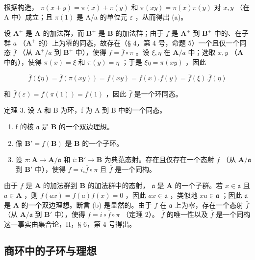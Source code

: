 根据构造， \(\pi(x + y) = \pi(x) + \pi(y)\) 和 \(\pi(xy) = \pi(x)\pi(y)\) 对 \(x, y\) （在 A 中）成立；且 \(\pi(1)\) 是 A/a 的单位元 \(\varepsilon\) ，从而得出 (a)。

设 \(\mathbf{A}^{+}\) 是 \(\mathbf{A}\) 的加法群，而 \(\mathbf{B}^{+}\) 是 \(\mathbf{B}\) 的加法群；由于 \(f\) 是 \(\mathbf{A}^{+}\) 到 \(\mathbf{B}^{+}\) 中的、在子群 \(a\) （\(\mathbf{A}^{+}\) 的）上为零的同态，故存在（§ 4，第 4 号，命题 5）一个且仅一个同态 \(\bar{f}\) （从 \(\mathbf{A}^{+}/a\) 到 \(\mathbf{B}^{+}\) 中），使得 \(f = \bar{f} \circ \pi\) 。设 \(\xi, \eta\) 在 \(\mathbf{A}/a\) 中；选取 \(x, y\) （\(\mathbf{A}\) 中的），使得 \(\pi(x) = \xi\) 和 \(\pi(y) = \eta\) ；于是 \(\xi \eta = \pi(xy)\) ，因此

\[
\bar {f} (\xi \eta) = \bar {f} (\pi (x y)) = f (x y) = f (x). f (y) = \bar {f} (\xi). \bar {f} (\eta)
\]

和 \(\bar{f}(\varepsilon) = f(\pi(1)) = f(1)\) ，因此 \(\bar{f}\) 是一个环同态。

定理 3. 设 A 和 B 为环，f 为 A 到 B 中的一个同态。

\begin{enumerate}
\def\labelenumi{(\alph{enumi})}
\item
  f 的核 \(\mathfrak{a}\) 是 \(\mathbf{B}\) 的一个双边理想。
\item
  像 \(\mathbf{B}' = f(\mathbf{B})\) 是 \(\mathbf{B}\) 的一个子环。
\item
  设 \(\pi: \mathbf{A} \to \mathbf{A} / \mathfrak{a}\) 和 \(i: \mathbf{B}' \to \mathbf{B}\) 为典范态射。存在且仅存在一个态射 \(\bar{f}\) （从 \(\mathbf{A} / \mathfrak{a}\) 到 \(\mathbf{B}'\) 中），使得 \(f = i_{\circ} \bar{f} \circ \pi\) 且 \(\bar{f}\) 是一个同构。
\end{enumerate}

由于 \(f\) 是 \(\mathbf{A}\) 的加法群到 \(\mathbf{B}\) 的加法群中的态射， \(\mathfrak{a}\) 是 \(\mathbf{A}\) 的一个子群。若 \(x \in \mathfrak{a}\) 且 \(a \in \mathbf{A}\) ，则 \(f(ax) = f(a)f(x) = 0\) ，因此 \(ax \in \mathfrak{a}\) ，类似地 \(xa \in \mathfrak{a}\) ；因此 \(\mathfrak{a}\) 是 \(\mathbf{A}\) 的一个双边理想。断言 (b) 是显然的。由于 \(f\) 在 \(\mathfrak{a}\) 上为零，存在一个态射 \(\bar{f}\) （从 \(\mathbf{A} / \mathfrak{a}\) 到 \(\mathbf{B}'\) 中），使得 \(f = i \circ \bar{f} \circ \pi\) （定理 2）。 \(\bar{f}\) 的唯一性以及 \(\bar{f}\) 是一个同构这一事实由集合论，II，§ 6，第 4 号得出。

\subsection{商环中的子环与理想}

